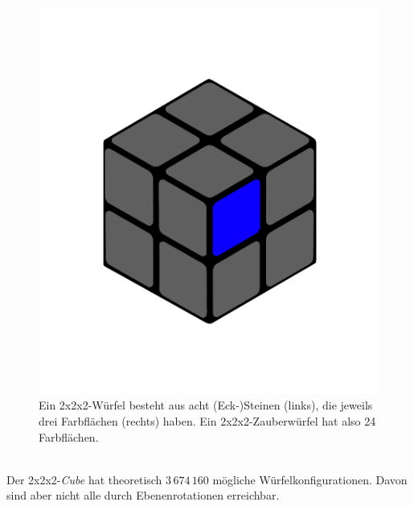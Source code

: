 \documentclass[12pt,a4paper, usenames, dvipsnames]{article}
\begin{document}
\begin{figure}[h]
\includegraphics[scale=0.1]{2x2farbflaeche.png}
\caption[Eckstein und Farbfläche des Würfels]{Ein 2x2x2-Würfel besteht aus acht (Eck-)Steinen (links), die jeweils drei Farbflächen (rechts) haben. Ein 2x2x2-Zauberwürfel hat also 24 Farbflächen.}
\end{figure} 
$\ $ \\
Der 2x2x2-\textit{Cube} hat theoretisch $3\, 674\, 160$ mögliche Würfelkonfigurationen. Davon sind aber nicht alle durch Ebenenrotationen erreichbar.
\end{document}
